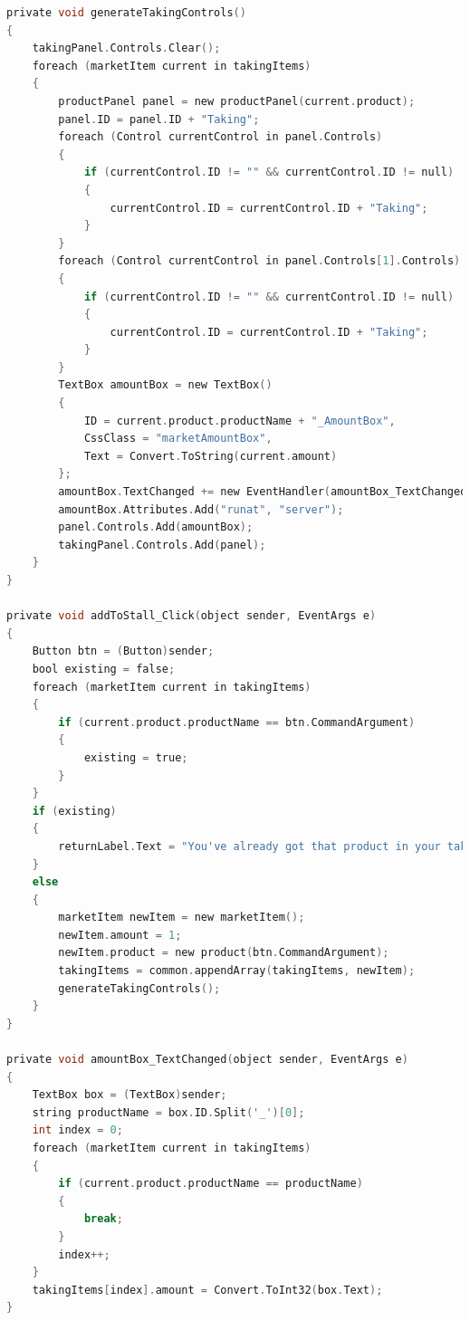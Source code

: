 ﻿\documentclass{article}
\begin{document}
\begin{lstlisting}[language=C]
private void generateTakingControls()
{
    takingPanel.Controls.Clear();
    foreach (marketItem current in takingItems)
    {
        productPanel panel = new productPanel(current.product);
        panel.ID = panel.ID + "Taking";
        foreach (Control currentControl in panel.Controls)
        {
            if (currentControl.ID != "" && currentControl.ID != null)
            {
                currentControl.ID = currentControl.ID + "Taking";
            }
        }
        foreach (Control currentControl in panel.Controls[1].Controls)
        {
            if (currentControl.ID != "" && currentControl.ID != null)
            {
                currentControl.ID = currentControl.ID + "Taking";
            }
        }
        TextBox amountBox = new TextBox()
        {
            ID = current.product.productName + "_AmountBox",
            CssClass = "marketAmountBox",
            Text = Convert.ToString(current.amount)
        };
        amountBox.TextChanged += new EventHandler(amountBox_TextChanged);
        amountBox.Attributes.Add("runat", "server");
        panel.Controls.Add(amountBox);
        takingPanel.Controls.Add(panel);
    }
}

private void addToStall_Click(object sender, EventArgs e)
{
    Button btn = (Button)sender;
    bool existing = false;
    foreach (marketItem current in takingItems)
    {
        if (current.product.productName == btn.CommandArgument)
        {
            existing = true;
        }
    }
    if (existing)
    {
        returnLabel.Text = "You've already got that product in your taking list, please update it's amount or remove it!";
    }
    else
    {
        marketItem newItem = new marketItem();
        newItem.amount = 1;
        newItem.product = new product(btn.CommandArgument);
        takingItems = common.appendArray(takingItems, newItem);
        generateTakingControls();
    }
}

private void amountBox_TextChanged(object sender, EventArgs e)
{
    TextBox box = (TextBox)sender;
    string productName = box.ID.Split('_')[0];
    int index = 0;
    foreach (marketItem current in takingItems)
    {
        if (current.product.productName == productName)
        {
            break;
        }
        index++;
    }
    takingItems[index].amount = Convert.ToInt32(box.Text);
}


\end{lstlisting}
\end{document}
